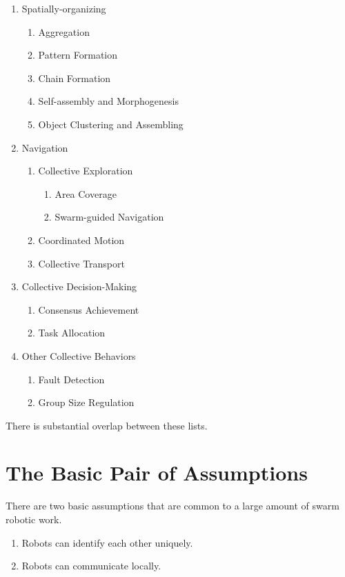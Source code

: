 \documentclass[]{article}
\begin{document}
\begin{enumerate}[noitemsep]
\item Spatially-organizing
	\begin{enumerate}[noitemsep]
	\item Aggregation
	\item Pattern Formation
	\item Chain Formation
	\item Self-assembly and Morphogenesis
	\item Object Clustering and Assembling
	\end{enumerate}
\item Navigation
	\begin{enumerate}[noitemsep]
	\item Collective Exploration
		\begin{enumerate}[noitemsep]
		\item Area Coverage
		\item Swarm-guided Navigation
		\end{enumerate}
	\item Coordinated Motion
	\item Collective Transport
	\end{enumerate}
\item Collective Decision-Making
	\begin{enumerate}[noitemsep]
	\item Consensus Achievement
	\item Task Allocation
	\end{enumerate}
\item Other Collective Behaviors
	\begin{enumerate}[noitemsep]
	\item Fault Detection
	\item Group Size Regulation
	\end{enumerate}
\end{enumerate}

There is substantial overlap between these lists.





\section{The Basic Pair of Assumptions}

There are two basic assumptions that are common to a large amount of swarm robotic work. 
\begin{enumerate}
\item Robots can identify each other uniquely.
\item Robots can communicate locally. 
\end{enumerate}
\end{document}
